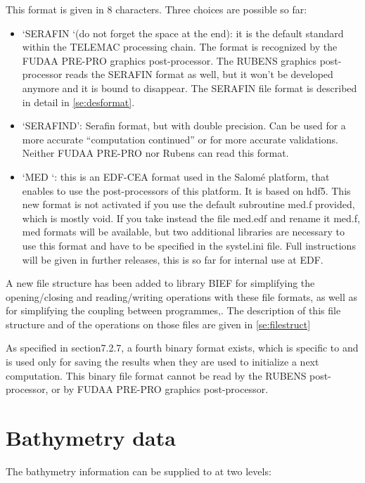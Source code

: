  This format is given in 8 characters. Three choices are possible so far:

\begin{itemize}
\item  `SERAFIN `(do not forget the space at the end): it is the default standard within the TELEMAC processing chain. The format is recognized by the FUDAA PRE-PRO graphics post-processor. The RUBENS graphics post-processor reads the SERAFIN format as well, but it won't be developed anymore and it is bound to disappear. The SERAFIN file format is described in detail in \ref{se:desformat}.

\item  `SERAFIND': Serafin format, but with double precision. Can be used for a more accurate ``computation continued'' or for more accurate validations. Neither FUDAA PRE-PRO nor Rubens can read this format.

\item  `MED  `: this is an EDF-CEA format used in the Salomé platform, that enables to use the post-processors of this platform. It is based on hdf5. This new format is not activated if you use the default subroutine med.f provided, which is mostly void. If you take instead the file med.edf and rename it med.f, med formats will be available, but two additional libraries are necessary to use this format and have to be specified in the systel.ini file. Full instructions will be given in further releases, this is so far for internal use at EDF.
\end{itemize}

 A new file structure has been added to library BIEF for simplifying the opening/closing and reading/writing operations with these file formats, as well as for simplifying the coupling between programmes,. The description of this file structure and of the operations on those files are given in \ref{se:filestruct}

 As specified in section7.2.7, a fourth binary format exists, which is specific to \tomawac and is used only for saving the results when they are used to initialize a next computation. This binary file format cannot be read by the RUBENS post-processor, or by FUDAA PRE-PRO graphics post-processor.


\section{ Bathymetry data }
\label{se:bathydata}
 The bathymetry information can be supplied to \tomawac at two levels:

